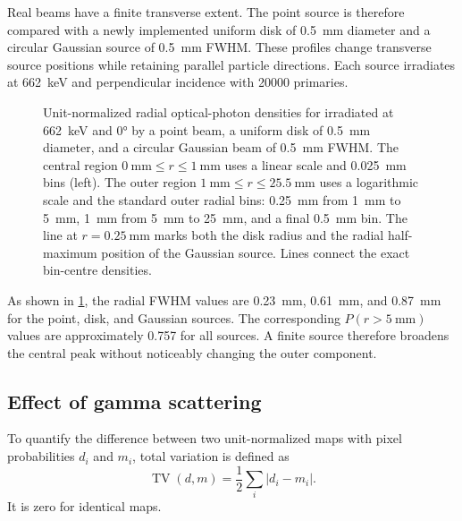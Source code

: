 Real beams have a finite transverse extent. The point source is therefore compared with a newly implemented uniform disk of \qty{0.5}{\milli\metre} diameter and a circular Gaussian source of \qty{0.5}{\milli\metre} FWHM. These profiles change transverse source positions while retaining parallel particle directions. Each source irradiates  at \qty{662}{\kilo\electronvolt} and perpendicular incidence with \num{20000} primaries.

\begin{figure}[H]
  \centering
  \caption{Unit-normalized radial optical-photon densities for  irradiated at \qty{662}{\kilo\electronvolt} and \ang{0} by a point beam, a uniform disk of \qty{0.5}{\milli\metre} diameter, and a circular Gaussian beam of \qty{0.5}{\milli\metre} FWHM. The central region $\qty{0}{\milli\metre}\leq r\leq\qty{1}{\milli\metre}$ uses a linear scale and \qty{0.025}{\milli\metre} bins (left). The outer region $\qty{1}{\milli\metre}\leq r\leq\qty{25.5}{\milli\metre}$ uses a logarithmic scale and the standard outer radial bins: \qty{0.25}{\milli\metre} from \qty{1}{\milli\metre} to \qty{5}{\milli\metre}, \qty{1}{\milli\metre} from \qty{5}{\milli\metre} to \qty{25}{\milli\metre}, and a final \qty{0.5}{\milli\metre} bin. The line at $r=\qty{0.25}{\milli\metre}$ marks both the disk radius and the radial half-maximum position of the Gaussian source. Lines connect the exact bin-centre densities.}
  \label{fig:source-profiles}
\end{figure}

As shown in \cref{fig:source-profiles}, the radial FWHM values are \qty{0.23}{\milli\metre}, \qty{0.61}{\milli\metre}, and \qty{0.87}{\milli\metre} for the point, disk, and Gaussian sources. The corresponding $P(r>\qty{5}{\milli\metre})$ values are approximately \num{0.757} for all sources. A finite source therefore broadens the central peak without noticeably changing the outer component.

\subsection{Effect of gamma scattering}
\label{sec:scattering-control}

To quantify the difference between two unit-normalized maps with pixel probabilities $d_i$ and $m_i$, total variation is defined as
\begin{equation}
  \operatorname{TV}(d,m)=\frac12\sum_i|d_i-m_i|.
  \label{eq:total-variation}
\end{equation}
It is zero for identical maps.


